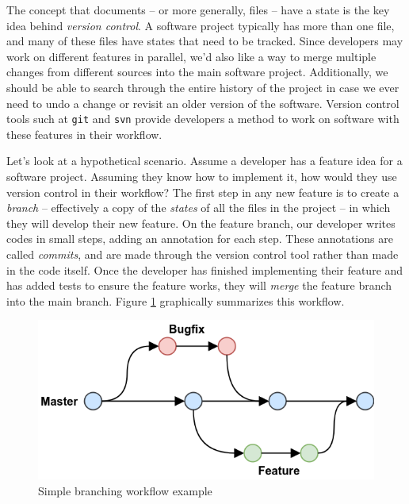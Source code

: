 \documentclass{anstrans}
\begin{document}
    The concept that documents -- or more generally, files -- have a state is the key idea behind {\it version control}. A software project typically has more than one file, and many of these files have states that need to be tracked. Since developers may work on different features in parallel, we'd also like a way to merge multiple changes from different sources into the main software project. Additionally, we should be able to search through the entire history of the project in case we ever need to undo a change or revisit an older version of the software. Version control tools such at \verb.git. and \verb.svn. provide developers a method to work on software with these features in their workflow.
    
    Let's look at a hypothetical scenario. Assume a developer has a feature idea for a software project. Assuming they know how to implement it, how would they use version control in their workflow? The first step in any new feature is to create a {\it branch} -- effectively a copy of the {\it states} of all the files in the project -- in which they will develop their new feature. On the feature branch, our developer writes codes in small steps, adding an annotation for each step. These
    annotations are called {\it commits}, and are made through the version control tool rather than made in the code itself. Once the developer has finished implementing their feature and has added tests to ensure the feature works, they will {\it merge} the feature branch into the main branch. Figure \ref{fig:gh-flow} graphically summarizes this workflow.
    
    \begin{figure}[ht] %
      \centering
      \includegraphics[width=\linewidth]{github-flow.png}
      \caption{Simple branching workflow example \cite{git_flow_fig}}
      \label{fig:gh-flow}
    \end{figure}
\end{document}
